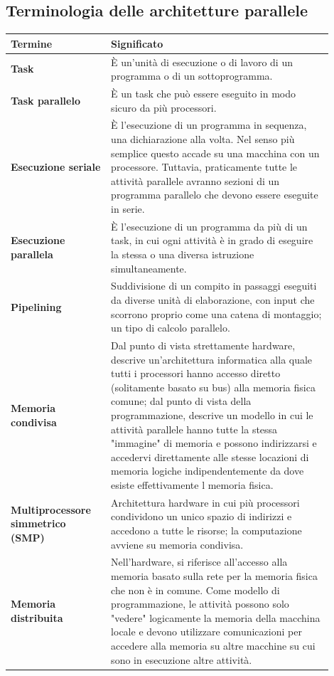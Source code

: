 \subsection{Terminologia delle architetture parallele}

	\begin{longtable}{|m{0.28\linewidth}|m{0.62\linewidth}|}
		\hline
		\textbf{Termine} & \textbf{Significato}
		\\
		\hline
		\textbf{Task} & È un'unità di esecuzione o di lavoro di un programma o di un sottoprogramma.
		\\
		\hline
		\textbf{Task parallelo}& È un task che può essere eseguito in modo sicuro da più processori.
		\\
		\hline
		\textbf{Esecuzione seriale} & È l'esecuzione di un programma in sequenza, una dichiarazione alla volta. Nel senso più semplice questo accade su una macchina con un processore. Tuttavia, praticamente tutte le attività parallele avranno sezioni di un programma parallelo che devono essere eseguite in serie.
		\\
		\hline
		\textbf{Esecuzione parallela} & È l'esecuzione di un programma da più di un task, in cui ogni attività è in grado di eseguire la stessa o una diversa istruzione simultaneamente.
		\\
		\hline
		\textbf{Pipelining} & Suddivisione di un compito in passaggi eseguiti da diverse unità di elaborazione, con input che scorrono proprio come una catena di montaggio; un tipo di calcolo parallelo.
		\\
		\hline
		\textbf{Memoria condivisa} & Dal punto di vista strettamente hardware, descrive un'architettura informatica alla quale tutti i processori hanno accesso diretto (solitamente basato su bus) alla memoria fisica comune; dal punto di vista della programmazione, descrive un modello in cui le attività parallele hanno tutte la stessa "immagine" di memoria e possono indirizzarsi e accedervi direttamente alle stesse locazioni di memoria logiche indipendentemente da dove esiste effettivamente l memoria fisica.
		\\
		\hline
		\textbf{Multiprocessore simmetrico (SMP)} & Architettura hardware in cui più processori condividono un unico spazio di indirizzi e accedono a tutte le risorse; la computazione avviene su memoria condivisa.
		\\
		\hline
		\textbf{Memoria distribuita} & Nell'hardware, si riferisce all'accesso alla memoria basato sulla rete per la memoria fisica che non è in comune. Come modello di programmazione, le attività possono solo "vedere" logicamente la memoria della macchina locale e devono utilizzare comunicazioni per accedere alla memoria su altre macchine su cui sono in esecuzione altre attività.
		\\
		\hline
	\end{longtable}